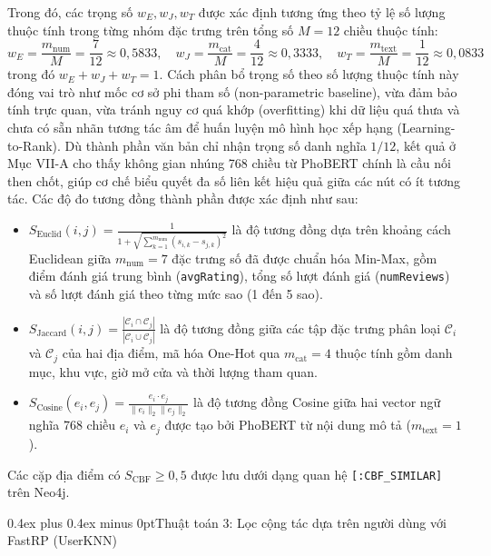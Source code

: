 \documentclass[journal,onecolumn,10pt]{IEEEtran}
\makeatletter
\newcommand{\code}[1]{\texttt{#1}}
\def\subsubsection{\@startsection{subsubsection}{3}{\z@}{1.4ex plus 0.8ex minus 0.2ex}%
{0.4ex plus 0.4ex minus 0pt}{\normalfont\normalsize\itshape}}
\makeatother
\begin{document}
Trong đó, các trọng số $w_E, w_J, w_T$ được xác định tương ứng theo tỷ lệ số lượng thuộc tính trong từng nhóm đặc trưng trên tổng số $M = 12$ chiều thuộc tính:
\begin{equation}
w_E = \frac{m_{\text{num}}}{M} = \frac{7}{12} \approx 0{,}5833, \quad
w_J = \frac{m_{\text{cat}}}{M} = \frac{4}{12} \approx 0{,}3333, \quad
w_T = \frac{m_{\text{text}}}{M} = \frac{1}{12} \approx 0{,}0833
\end{equation}
trong đó $w_E + w_J + w_T = 1$. Cách phân bổ trọng số theo số lượng thuộc tính này đóng vai trò như mốc cơ sở phi tham số (non-parametric baseline), vừa đảm bảo tính trực quan, vừa tránh nguy cơ quá khớp (overfitting) khi dữ liệu quá thưa và chưa có sẵn nhãn tương tác âm để huấn luyện mô hình học xếp hạng (Learning-to-Rank). Dù thành phần văn bản chỉ nhận trọng số danh nghĩa $1/12$, kết quả ở Mục VII-A cho thấy không gian nhúng 768 chiều từ PhoBERT chính là cầu nối then chốt, giúp cơ chế biểu quyết đa số liên kết hiệu quả giữa các nút có ít tương tác. Các độ đo tương đồng thành phần được xác định như sau:

\begin{itemize}
    \item $S_{\text{Euclid}}(i,j)
    = \frac{1}{1+\sqrt{\sum_{k=1}^{m_{\text{num}}}(s_{i,k}-s_{j,k})^2}}$
    là độ tương đồng dựa trên khoảng cách Euclidean giữa $m_{\text{num}} = 7$ đặc trưng số đã được chuẩn hóa Min-Max, gồm điểm đánh giá trung bình (\code{avgRating}), tổng số lượt đánh giá (\code{numReviews}) và số lượt đánh giá theo từng mức sao (1 đến 5 sao).

    \item $S_{\text{Jaccard}}(i,j)
    = \frac{|\mathcal{C}_i \cap \mathcal{C}_j|}
    {|\mathcal{C}_i \cup \mathcal{C}_j|}$
    là độ tương đồng giữa các tập đặc trưng phân loại $\mathcal{C}_i$ và $\mathcal{C}_j$ của hai địa điểm, mã hóa One-Hot qua $m_{\text{cat}} = 4$ thuộc tính gồm danh mục, khu vực, giờ mở cửa và thời lượng tham quan.

    \item $S_{\text{Cosine}}(e_i,e_j)
    = \frac{e_i\cdot e_j}
    {\|e_i\|_2\|e_j\|_2}$
    là độ tương đồng Cosine giữa hai vector ngữ nghĩa 768 chiều $e_i$ và $e_j$ được tạo bởi PhoBERT từ nội dung mô tả ($m_{\text{text}} = 1$).
\end{itemize}

Các cặp địa điểm có $S_{\text{CBF}}\geq 0{,}5$ được lưu dưới dạng quan hệ \code{[:CBF\_SIMILAR]} trên Neo4j.

\subsubsection{Thuật toán 3: Lọc cộng tác dựa trên người dùng với FastRP (UserKNN)}
\end{document}
